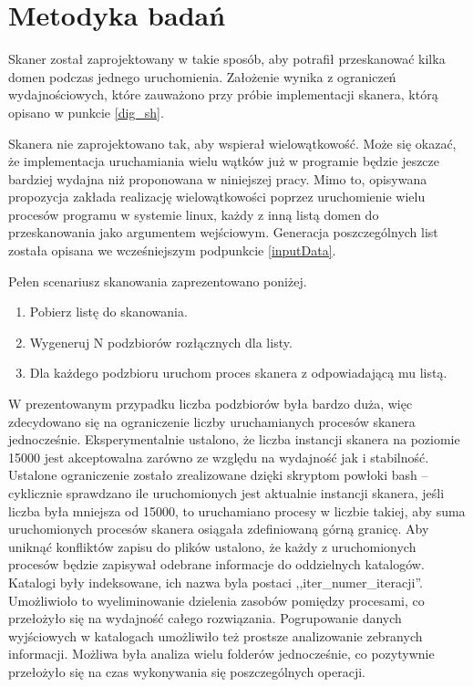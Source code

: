 \section{Metodyka badań}
Skaner został zaprojektowany w takie sposób, aby potrafił przeskanować kilka domen podczas jednego uruchomienia. Założenie wynika z
ograniczeń wydajnościowych, które zauważono przy próbie implementacji skanera, którą opisano w punkcie \ref{dig_sh}.

Skanera nie zaprojektowano tak, aby wspierał wielowątkowość. Może się okazać, że implementacja uruchamiania wielu wątków już w programie
będzie jeszcze bardziej wydajna niż proponowana w niniejszej pracy. Mimo to, opisywana propozycja zakłada realizację wielowątkowości
poprzez uruchomienie wielu procesów programu w systemie linux, każdy z inną listą domen do przeskanowania jako argumentem wejściowym.
Generacja poszczególnych list została opisana we wcześniejszym podpunkcie \ref{inputData}.

Pełen scenariusz skanowania zaprezentowano poniżej.
\begin{enumerate}
	\item Pobierz listę do skanowania.
	\item Wygeneruj N podzbiorów rozłącznych dla listy.
	\item Dla każdego podzbioru uruchom proces skanera z odpowiadającą mu listą.
\end{enumerate}

W prezentowanym przypadku liczba podzbiorów była bardzo duża, więc zdecydowano się na ograniczenie liczby uruchamianych procesów
skanera jednocześnie. Eksperymentalnie ustalono, że liczba instancji skanera na poziomie 15000 jest akceptowalna zarówno ze względu
na wydajność jak i stabilność. Ustalone ograniczenie zostało zrealizowane dzięki skryptom powłoki bash -- cyklicznie sprawdzano ile
uruchomionych jest aktualnie instancji skanera, jeśli liczba była mniejsza od 15000, to uruchamiano procesy w liczbie takiej,
aby suma uruchomionych procesów skanera osiągała zdefiniowaną górną granicę. Aby uniknąć konfliktów zapisu do plików ustalono,
że każdy z uruchomionych
procesów będzie zapisywał odebrane informacje do oddzielnych katalogów. Katalogi były indeksowane, ich nazwa byla postaci
,,iter\_{numer\_iteracji}''. Umożliwioło to wyeliminowanie dzielenia zasobów pomiędzy procesami, co przełożyło się na wydajność całego
rozwiązania. Pogrupowanie danych wyjściowych w katalogach umożliwiło też prostsze analizowanie zebranych informacji. Możliwa była
analiza wielu folderów jednocześnie, co pozytywnie przełożyło się na czas wykonywania się poszczególnych operacji.

